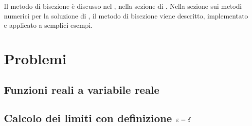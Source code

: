 \documentclass[letterpaper,10pt,italian]{jupyterBook}
\begin{document}
\sphinxAtStartPar
Il metodo di bisezione è discusso nel , nella sezione di . Nella sezione sui metodi numerici per la soluzione di , il metodo di bisezione viene descritto, implementato e applicato a semplici esempi.



\sphinxstepscope


\section{Problemi}
\label{\detokenize{ch/infinitesimal_calculus/analysis-problems:problemi}}\label{\detokenize{ch/infinitesimal_calculus/analysis-problems:infinitesimal-calculus-analysis-problems}}\label{\detokenize{ch/infinitesimal_calculus/analysis-problems::doc}}

\subsection{Funzioni reali a variabile reale}
\label{\detokenize{ch/infinitesimal_calculus/analysis-problems:funzioni-reali-a-variabile-reale}}

\subsection{Calcolo dei limiti con definizione \protect\(\varepsilon-\delta\protect\)}
\label{\detokenize{ch/infinitesimal_calculus/analysis-problems:calcolo-dei-limiti-con-definizione-varepsilon-delta}} \label{exercise:ch/infinitesimal_calculus/analysis-problems-exercise-0}
\end{document}
